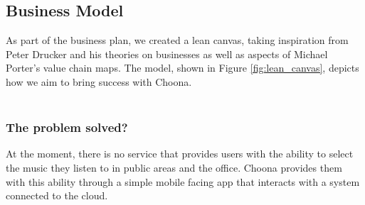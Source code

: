 \subsection{Business Model}
As part of the business plan, we created a lean canvas, taking inspiration from Peter Drucker and his theories on businesses as well as aspects of Michael Porter's value chain maps.  The model, shown in Figure \ref{fig:lean_canvas}, depicts how we aim to bring success with Choona.\\

\noindent{}\\

\subsubsection{The problem solved?}
At the moment, there is no service that provides users with the ability to select the music they listen to in public areas and the office.  Choona provides them with this ability through a simple mobile facing app that interacts with a system connected to the cloud.   \\

